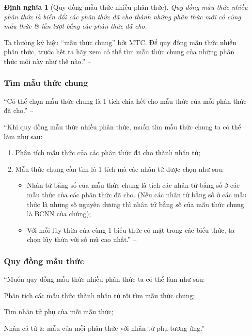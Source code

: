 \documentclass{article}
\numberwithin{equation}{section}
\newtheorem{dinhnghia}{Định nghĩa}[section]
\begin{document}
\begin{dinhnghia}[Quy đồng mẫu thức nhiều phân thức]
	\emph{Quy đồng mẫu thức nhiều phân thức} là biến đổi các phân thức đã cho thành những phân thức mới có cùng mẫu thức \& lần lượt bằng các phân thức đã cho.
\end{dinhnghia}
Ta thường ký hiệu ``mẫu thức chung'' bởi MTC. Để quy đồng mẫu thức nhiều phân thức, trước hết ta hãy xem có thể tìm mẫu thức chung của những phân thức mới này như thế nào.'' -- \cite[p. 41]{SGK_Toan_8_tap_1}

\subsubsection{Tìm mẫu thức chung}
``Có thể chọn mẫu thức chung là 1 tích chia hết cho mẫu thức của mỗi phân thức đã cho.'' -- \cite[p. 41]{SGK_Toan_8_tap_1}

``Khi quy đồng mẫu thức nhiều phân thức, muốn tìm mẫu thức chung ta có thể làm như sau: 
\begin{enumerate}
	\item Phân tích mẫu thức của các phân thức đã cho thành nhân tử;
	\item Mẫu thức chung cần tìm là 1 tích mà các nhân tử được chọn như sau:
	\begin{itemize}
		\item Nhân tử bằng số của mẫu thức chung là tích các nhân tử bằng số ở các mẫu thức của các phân thức đã cho. (Nếu các nhân tử bằng số ở các mẫu thức là những số nguyên dương thì nhân tử bằng số của mẫu thức chung là BCNN của chúng);
		\item Với mỗi lũy thừa của cùng 1 biểu thức có mặt trong các biểu thức, ta chọn lũy thừa với số mũ cao nhất.'' -- \cite[p. 42]{SGK_Toan_8_tap_1}		
	\end{itemize}
\end{enumerate}

\subsubsection{Quy đồng mẫu thức}
``Muốn quy đồng mẫu thức nhiều phân thức ta có thể làm như sau:
\begin{enumerate*}
	\item Phân tích các mẫu thức thành nhân tử rồi tìm mẫu thức chung;
	\item Tìm nhân tử phụ của mỗi mẫu thức;
	\item Nhân cả tử \& mẫu của mỗi phân thức với nhân tử phụ tương ứng.'' -- \cite[p. 42]{SGK_Toan_8_tap_1}
\end{enumerate*}
\end{document}
